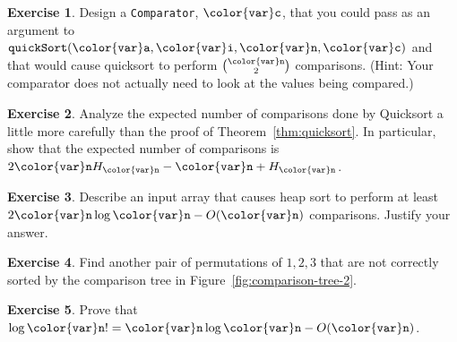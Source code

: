 \documentclass[10pt]{book}
\newcommand{\figref}[1]{Figure~\ref{fig:#1}}
\theoremstyle{plain}
\newcommand{\thmref}[1]{Theorem~\ref{thm:#1}}
\theoremstyle{definition}
\newtheorem{exc}{Exercise}[chapter]
\newcommand{\exclabel}[1]{\label{exc:#1}}
\begin{document}
\begin{exc}
  Design a \texttt{Comparator}, \ensuremath{\mathtt{{\color{var}c}}}, that you could pass as an argument
  to \ensuremath{\mathtt{quickSort({\color{var}a},{\color{var}i},{\color{var}n},{\color{var}c})}} and that would cause quicksort to perform
  $\binom{\ensuremath{\mathtt{{\color{var}n}}}}{2}$ comparisons.  (Hint: Your comparator does not actually
  need to look at the values being compared.)
\end{exc}

\begin{exc}
  Analyze the expected number of comparisons done by Quicksort a little
  more carefully than the proof of \thmref{quicksort}.  In particular, show
  that the expected number of comparisons is $2\ensuremath{\mathtt{{\color{var}n}}}H_\ensuremath{\mathtt{{\color{var}n}}} -\ensuremath{\mathtt{{\color{var}n}}} + H_\ensuremath{\mathtt{{\color{var}n}}}$.
\end{exc}

\begin{exc}
  Describe an input array that causes heap sort to perform at least
  $2\ensuremath{\mathtt{{\color{var}n}}}\log \ensuremath{\mathtt{{\color{var}n}}}-O(\ensuremath{\mathtt{{\color{var}n}}})$ comparisons.  Justify your answer.
\end{exc}


\begin{exc}
  Find another pair of permutations of $1,2,3$ that are not correctly
  sorted by the comparison tree in \figref{comparison-tree-2}.
\end{exc}

\begin{exc}\exclabel{log-factorial}
  Prove that $\log \ensuremath{\mathtt{{\color{var}n}}}! = \ensuremath{\mathtt{{\color{var}n}}}\log \ensuremath{\mathtt{{\color{var}n}}}-O(\ensuremath{\mathtt{{\color{var}n}}})$.
\end{exc}
\end{document}
